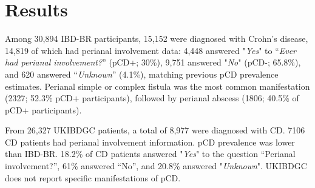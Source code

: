 



\section{Results}
Among 30,894 IBD-BR participants, 15,152 were diagnosed with Crohn's disease, 14,819 of which had perianal involvement data: 4,448 answered "\textit{Yes}" to “\textit{Ever had perianal involvement?}” (pCD+; 30\%), 9,751 answered "\textit{No}" (pCD-; 65.8\%), and 620 answered “\textit{Unknown}” (4.1\%), matching previous pCD prevalence estimates. Perianal simple or complex fistula was the most common manifestation (2327;  52.3\% pCD+ participants), followed by perianal abscess (1806; 40.5\% of pCD+ participants).

From 26,327 UKIBDGC patients, a total of 8,977 were diagnosed with CD. 7106 CD patients had perianal involvement information. pCD prevalence was lower than IBD-BR. 18.2\% of CD patients answered "\textit{Yes}" to the question “Perianal involvement?”, 61\% answered “No”, and 20.8\% answered "\textit{Unknown}". UKIBDGC does not report specific manifestations of pCD.

